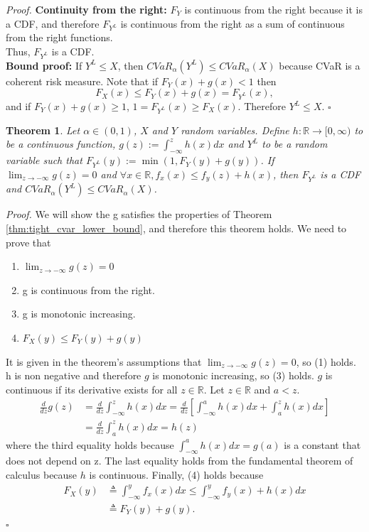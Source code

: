 \documentclass[letterpaper]{article} %
\newtheorem{theorem}{Theorem}[section]
\newenvironment{proof}{\noindent\textit{Proof.}}{\hfill$\square$}
\begin{document}
\begin{proof}
	\textbf{Continuity from the right:}
	$F_Y$ is continuous from the right because it is a CDF, and therefore $F_{Y^L}$ is continuous from the right as a sum of continuous from the right functions. \\
	Thus, $F_{Y^L}$ is a CDF. \\
	
	\textbf{Bound proof:}
	If $Y^L\leq X$, then $CVaR_\alpha(Y^L)\leq CVaR_\alpha(X)$ because CVaR is a coherent risk measure. Note that 
	if $F_Y(x) + g(x)<1$ then
	$$F_X(x)\leq F_Y(x) + g(x)=F_{Y^L}(x),$$
	and if $F_Y(x) + g(x)\geq 1$, $1=F_{Y^L}(x)\geq F_X(x)$. Therefore $Y^L\leq X$.
\end{proof}

\begin{theorem}\label{thm:lower_cvar_bound_using_density_bound}
	Let $\alpha \in (0,1)$, $X$ and $Y$ random variables. Define $h:\mathbb{R}\rightarrow [0,\infty)$ to be a continuous function, $g(z):=\int_{-\infty}^z h(x)dx$ and $Y^L$ to be a random variable such that $F_{Y^L}(y):=\min(1, F_{Y}(y) + g(y))$. If $\lim_{z\rightarrow -\infty} g(z)=0$ and $\forall x\in \mathbb{R},f_x(x)\leq f_y(z) + h(x)$, then $F_{Y^L}$ is a CDF and $CVaR_\alpha(Y^L)\leq CVaR_\alpha(X)$.
\end{theorem}
\begin{proof}
	We will show the g satisfies the properties of Theorem \ref{thm:tight_cvar_lower_bound}, and therefore this theorem holds. We need to prove that \begin{enumerate}
		\item $\lim_{z\rightarrow -\infty} g(z)=0$
		\item g is continuous from the right.
		\item g is monotonic increasing.
		\item $F_X(y)\leq F_Y(y) + g(y)$
	\end{enumerate}
	It is given in the theorem's assumptions that $\lim_{z\rightarrow -\infty} g(z)=0$, so (1) holds. h is non negative and therefore $g$ is monotonic increasing, so (3) holds. $g$ is continuous if its derivative exists for all $z\in \mathbb{R}$. Let $z\in \mathbb{R}$ and $a<z$.
	\begin{equation}
		\begin{aligned}
			\frac{d}{dz}g(z) &= \frac{d}{dz}\int_{-\infty}^z h(x)dx = \frac{d}{dz}[\int_{-\infty}^a h(x)dx + \int_{a}^z h(x)dx] \\
			&=\frac{d}{dz}\int_{a}^z h(x)dx = h(z)
		\end{aligned}
	\end{equation}
	where the third equality holds because $\int_{-\infty}^a h(x)dx = g(a)$ is a constant that does not depend on z. The last equality holds from the fundamental theorem of calculus because $h$ is continuous. Finally, (4) holds because \begin{equation}
		\begin{aligned}
			F_X(y) &\triangleq \int_{-\infty}^y f_x(x)dx\leq \int_{-\infty}^y f_y(x) + h(x)dx \\
			&\triangleq F_Y(y) + g(y).
		\end{aligned}
	\end{equation}
\end{proof}
\end{document}
